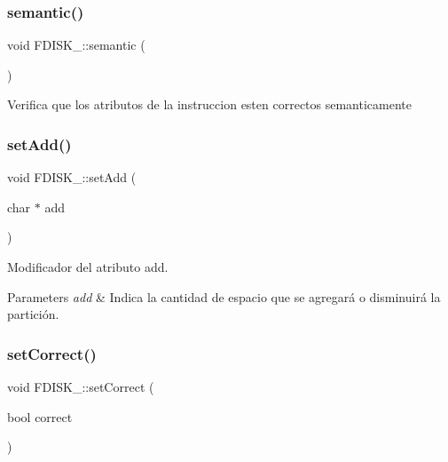 \subsubsection{\texorpdfstring{semantic()}{semantic()}}
{\footnotesize\ttfamily void F\+D\+I\+S\+K\+\_\+\+::semantic (\begin{DoxyParamCaption}{ }\end{DoxyParamCaption})\hspace{0.3cm}{\ttfamily [inline]}}

Verifica que los atributos de la instruccion esten correctos semanticamente \mbox{\label{classFDISK___a6de35bf474b492d03494d5cdf373df1a}} 
\subsubsection{\texorpdfstring{set\+Add()}{setAdd()}}
{\footnotesize\ttfamily void F\+D\+I\+S\+K\+\_\+\+::set\+Add (\begin{DoxyParamCaption}\item[{char $\ast$}]{add }\end{DoxyParamCaption})\hspace{0.3cm}{\ttfamily [inline]}}

Modificador del atributo add. 
\begin{DoxyParams}{Parameters}
{\em add} & Indica la cantidad de espacio que se agregará o disminuirá la partición. \\
\hline
\end{DoxyParams}
\mbox{\label{classFDISK___a95fb02a0658219e583601de4844a517c}} 
\subsubsection{\texorpdfstring{set\+Correct()}{setCorrect()}}
{\footnotesize\ttfamily void F\+D\+I\+S\+K\+\_\+\+::set\+Correct (\begin{DoxyParamCaption}\item[{bool}]{correct }\end{DoxyParamCaption})\hspace{0.3cm}{\ttfamily [inline]}}

